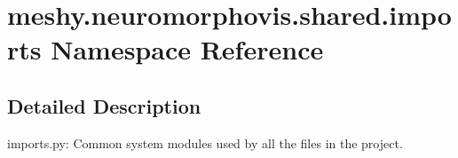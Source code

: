 \hypertarget{namespacemeshy_1_1neuromorphovis_1_1shared_1_1imports}{}\section{meshy.\+neuromorphovis.\+shared.\+imports Namespace Reference}
\label{namespacemeshy_1_1neuromorphovis_1_1shared_1_1imports}


\subsection{Detailed Description}
\begin{DoxyVerb}imports.py: 
    Common system modules used by all the files in the project.
\end{DoxyVerb}
 